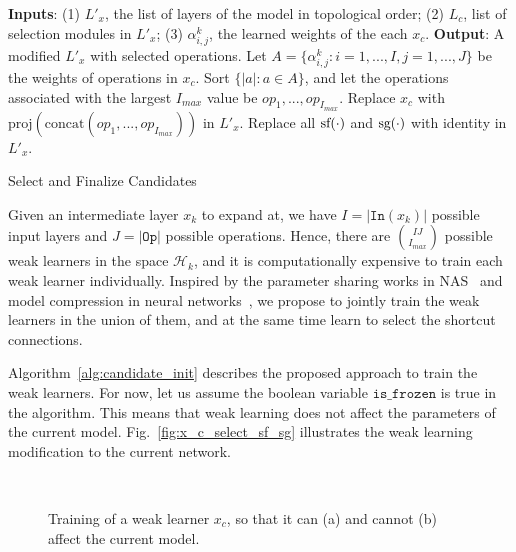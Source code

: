 \begin{algorithm}[t]
\begin{algorithmic}[1]
\STATE \textbf{Inputs}: (1) $L'_x$, the list of layers of the model in topological order;
(2) $L_c$, list of selection modules in $L'_x$;
(3) $\alpha^k_{i,j}$, the learned weights of the each $x_c$. 
\STATE \textbf{Output}: A modified $L'_x$ with selected operations.
    \STATE Let $A = \{\alpha^{k}_{i,j}: i = 1,..., I, j = 1,..., J\}$  be the weights of operations in $x_c$.
    \STATE Sort $\{ |a| : a \in A \}$, and let the operations associated with the largest $I_{max}$ value be $op_1, ..., op_{I_{max}}$.
    \STATE Replace $x_c$ with $\text{proj}(\text{concat}(op_1, ..., op_{I_{max}}))$ in $L'_x$.
\ENDFOR
\STATE Replace all $\textrm{sf} (\cdot)$ and $\textrm{sg} (\cdot)$ with identity in $L'_x$.
\end{algorithmic}
\caption{Select and Finalize Candidates}
\label{alg:candidate_select}
\end{algorithm}


Given an intermediate layer $x_{k}$ to expand at, we have $I = |\texttt{In}(x_{k})|$ possible input layers and $J = |\texttt{Op}|$ possible operations.
Hence, there are $\binom{IJ}{I_{max}}$ possible weak learners
in the space $\mathcal{H}_{k}$, and it is computationally expensive to train each weak learner individually. 
Inspired by the parameter sharing works in NAS~\citep{Pham2018EfficientNA,Liu2018DARTSDA} and model compression in neural networks~\citep{huang2017condensenet},
we propose to jointly train the weak learners in the union of them, 
and at the same time learn to select the shortcut connections. 


Algorithm~\ref{alg:candidate_init} describes the proposed approach to train the weak learners. 
For now, let us assume the boolean variable
$\texttt{is\_frozen}$ is true in the algorithm. This means that weak learning does not affect the parameters of the current model. 
Fig.~\ref{fig:x_c_select_sf_sg} illustrates the weak learning modification to the current network. 

\begin{figure}[ht]
\centering
{}
    ~
    \caption{Training of a weak learner $x_c$, so that it can (a) and cannot (b) affect the current model.}
\end{figure}

